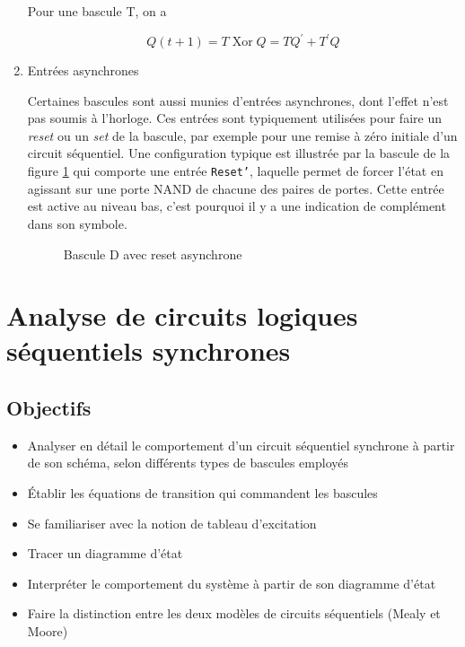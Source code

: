 \documentclass[letter, oneside]{book}
\begin{document}
\begin{enumerate}
Pour une bascule T, on a

$$ Q(t+1) = T \operatorname{Xor} Q = T Q^\prime + T^\prime Q $$

\item Entrées asynchrones
\label{sec:org5216025}

Certaines bascules sont aussi munies d'entrées asynchrones, dont
l'effet n'est pas soumis à l'horloge. Ces entrées sont typiquement
utilisées pour faire un \emph{reset} ou un \emph{set} de la bascule, par exemple
pour une remise à zéro initiale d'un circuit séquentiel. Une
configuration typique est illustrée par la bascule de la figure
\ref{fig:org00f69a5} qui comporte une entrée \texttt{Reset'}, laquelle
permet de forcer l'état en agissant sur une porte NAND de chacune des
paires de portes. Cette entrée est active au niveau bas, c'est
pourquoi il y a une indication de complément dans son symbole.

\begin{figure}[htbp]
\centering

\caption{\label{fig:org00f69a5}Bascule D avec reset asynchrone}
\end{figure}
\end{enumerate}

\chapter{Analyse de circuits logiques séquentiels synchrones}
\label{sec:org167b719}
\section{Objectifs}
\label{sec:org0ead4bd}
\begin{itemize}
\item Analyser en détail le comportement d'un circuit séquentiel
synchrone à partir de son schéma, selon différents types de bascules
employés
\item Établir les équations de transition qui commandent les bascules
\item Se familiariser avec la notion de tableau d'excitation
\item Tracer un diagramme d'état
\item Interpréter le comportement du système à partir de son
diagramme d'état
\item Faire la distinction entre les deux modèles de circuits séquentiels
(Mealy et Moore)
\end{itemize}
\end{document}
